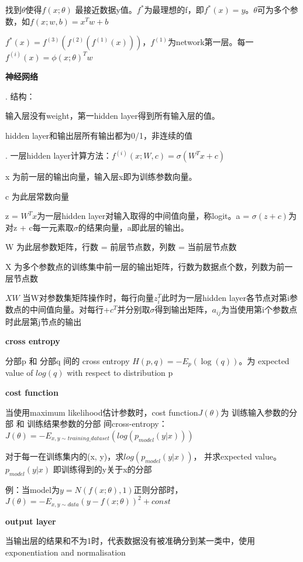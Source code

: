 \documentclass[UTF8]{ctexart}
\begin{document}
  找到$\theta$使得$f(x; \theta )$ 最接近数据y值。$f^*$为最理想的f，即$f^*(x) = y$。$\theta $可为多个参数，如$f(x; w, b) = x^Tw+b$

  $f^*(x) = f^{(3)}(f^{(2)}(f^{(1)}(x)))$，$f^{(1)}$为network第一层。每一$f^{(i)}(x) = \phi (x; \theta )^Tw$

  \textbf{神经网络}

  . 结构：

  \quad \quad 输入层没有weight，第一hidden layer得到所有输入层的值。

  \quad \quad hidden layer和输出层所有输出都为0/1，非连续的值

  . 一层hidden layer计算方法：$ f^{(i)}(x; W, c) = \sigma (W^Tx + c)$

  \quad \quad x 为前一层的输出向量，输入层x即为训练参数向量。 

  \quad \quad c 为此层常数向量

  \quad \quad z = $W^Tx$为一层hidden layer对输入取得的中间值向量，称logit。a = $\sigma (z + c)$为对z + c每一元素取$\sigma $的结果向量，a即此层的输出。

  \quad \quad W 为此层参数矩阵，行数 = 前层节点数，列数 = 当前层节点数

  \quad \quad X 为多个参数点的训练集中前一层的输出矩阵，行数为数据点个数，列数为前一层节点数

  \quad \quad $XW$ 当W对参数集矩阵操作时，每行向量$z_{i}^T$此时为一层hidden layer各节点对第i参数点的中间值向量。对每行+$c^T$并分别取$\sigma $得到输出矩阵，$a_{ij}$为当使用第i个参数点时此层第j节点的输出

  \textbf{cross entropy}

  \quad 分部p 和 分部q 间的 cross entropy $H(p, q) = -E_p(\log (q))$。为 expected value of $log (q)$ with respect to distribution p

  \textbf{cost function}

  \quad 当使用maximum likelihood估计参数时，cost function$J(\theta )$为 训练输入参数的分部 和 训练结果参数的分部 间cross-entropy： $J(\theta ) = -E_{x, y\sim training\_dataset}(log (p_{model}(y | x)))$

  \quad \quad 对于每一在训练集内的(x, y)，求$log (p_{model}(y | x))$， 并求expected value。$p_{model}(y | x)$ 即训练得到的y关于x的分部

  \quad \quad 例：当model为$y = N(f(x; \theta), 1)$正则分部时，$J(\theta) = -E_{x, y\sim data}(y - f(x;\theta))^2 + const$

  \textbf{output layer}

  \quad 当输出层的结果和不为1时，代表数据没有被准确分到某一类中，使用exponentiation and normalisation
\end{document}
